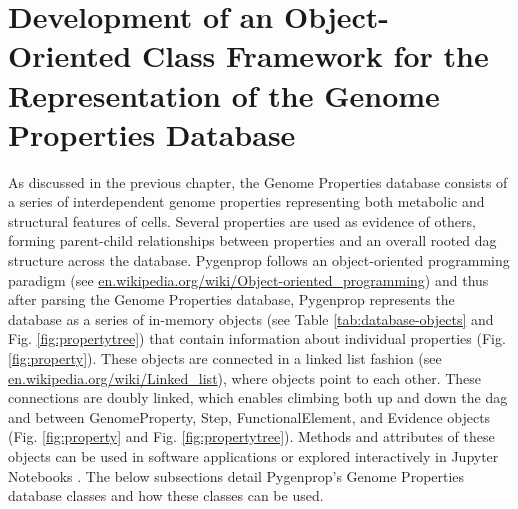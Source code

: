 \section{Development of an Object-Oriented Class Framework for the 
Representation of the Genome Properties Database} \label{genomeprop-oop}

As discussed in the previous chapter, the Genome Properties database consists of 
a series of interdependent genome properties representing both metabolic and 
structural features of cells. Several properties are used as evidence of others, 
forming parent-child relationships between properties and an overall rooted 
\gls{dag} structure across the database. Pygenprop follows an object-oriented 
programming paradigm \cite{booch1986object} (see 
\href{http://en.wikipedia.org/wiki/Object-oriented_programming}{en.wikipedia.org/wiki/Object-oriented\_programming}) 
and thus after parsing the Genome Properties database, Pygenprop represents the 
database as a series of in-memory objects (see Table \ref{tab:database-objects} 
and Fig. \ref{fig:propertytree}) that contain information about individual 
properties (Fig. \ref{fig:property}). These objects are connected in a linked 
list fashion \cite{newell1957programming} (see 
\href{http://en.wikipedia.org/wiki/Linked_list}{en.wikipedia.org/wiki/Linked\_list}), 
where objects point to each other. These connections are doubly linked, which 
enables climbing both up and down the \gls{dag} and between GenomeProperty, 
Step, FunctionalElement, and Evidence objects (Fig. \ref{fig:property} and Fig. 
\ref{fig:propertytree}). Methods and attributes of these objects can be used in 
software applications or explored interactively in Jupyter Notebooks 
\cite{kluyver2016jupyter}. The below subsections detail Pygenprop's Genome 
Properties database classes and how these classes can be used. 

